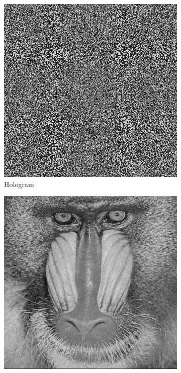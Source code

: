 \begin{figure}[H]
\begin{subfigure}[t]{0.3\textwidth}
    \includegraphics[width=\textwidth]{GS_holo_i_30.png}
    \caption{Hologram}
    \label{fig:GS_holo_i_30}
  \end{subfigure}
  \hfill
  \begin{subfigure}[t]{0.3\textwidth}
    \centering
    \includegraphics[width=\textwidth]{GS_recon_i_30.png}

\end{subfigure}
\end{figure}
